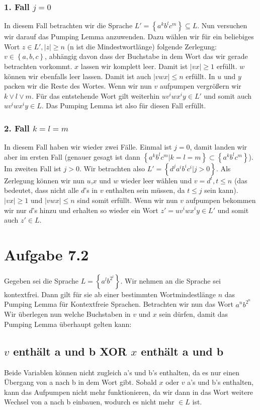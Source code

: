 \documentclass{article}
\begin{document}
\subsubsection*{1. Fall $j=0$}
In diesem Fall betrachten wir die Sprache $L'=\left\{a^kb^lc^m\right\} \subseteq L$. Nun versuchen wir darauf das Pumping Lemma anzuwenden. Dazu wählen wir für ein beliebiges Wort $z\in L',|z|\geq n$ (n ist die Mindestwortlänge) folgende Zerlegung: $v\in \left\{a,b,c\right\}$, abhängig davon dass der Buchstabe in dem Wort das wir gerade betrachten vorkommt. $x$ lassen wir komplett leer. Damit ist $|vx| \geq 1$ erfüllt. $w$ können wir ebenfalls leer lassen. Damit ist auch $|vwx| \leq n$ erfüllt. In $u$ und $y$ packen wir die Reste des Wortes. Wenn wir nun $v$ aufpumpen vergrößern wir $k \vee l \vee m$. Für das entstehende Wort gilt weiterhin $uv^iwx^iy \in L'$ und somit auch $uv^iwx^iy \in L$. Das Pumping Lemma ist also für diesen Fall erfüllt.

\subsubsection*{2. Fall $k=l=m$}
In diesem Fall haben wir wieder zwei Fälle. Einmal ist $j=0$, damit landen wir aber im ersten Fall (genauer gesagt ist dann $\left\{a^kb^lc^m|k=l=m\right\} \subset \left\{a^kb^lc^m\right\}$). Im zweiten Fall ist $j>0$. Wir betrachten also $L'=\left\{d^ja^ib^ic^i|j>0\right\}$. Als Zerlegung können wir nun $u$,$x$ und $w$ wieder leer wählen und $v=d^t, t\leq n$ (das bedeutet, dass nicht alle $d$'s in $v$ enthalten sein müssen, da $t\leq j$ sein kann). $|vx| \geq 1$ und $|vwx| \leq n$ sind somit erfüllt. Wenn wir nun $v$ aufpumpen bekommen wir nur $d$'s hinzu und erhalten so wieder ein Wort $z' = uv^iwx^iy \in L'$ und somit auch $z' \in L$.


\section*{Aufgabe 7.2}
Gegeben sei die Sprache $L = \left\{ a^lb^{2^l} \right\}$. Wir nehmen an die Sprache sei kontextfrei. Dann gilt für sie ab einer bestimmten Wortmindestlänge $n$ das Pumping Lemma für Kontextfreie Sprachen. Betrachten wir nun das Wort $a^nb^{2^n}$ Wir überlegen nun welche Buchstaben in $v$ und $x$ sein dürfen, damit das Pumping Lemma überhaupt gelten kann:

\subsection{$v$ enthält a und b XOR $x$ enthält a und b}
Beide Variablen können nicht zugleich a's und b's enthalten, da es nur einen Übergang von a nach b in dem Wort gibt. Sobald $x$ oder $v$ a's und b's enthalten, kann das Aufpumpen nicht mehr funktionieren, da wir dann in das Wort weitere Wechsel von a nach b einbauen, wodurch es nicht mehr $\in L$ ist.
\end{document}
